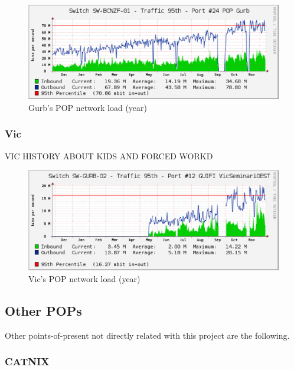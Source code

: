 \begin{figure}[htbp]
  \centering
  \includegraphics[scale=.65]{sect3/figures/gurb_network_load_year.eps} 
  \caption{Gurb's POP network load (year)}
  \label{fig:gurb_net_load}
\end{figure}


\subsubsection{Vic}

VIC HISTORY ABOUT KIDS AND FORCED WORKD

\begin{figure}[htbp]
  \centering
  \includegraphics[scale=.65]{sect3/figures/vic_network_load_year.eps} 
  \caption{Vic's POP network load (year)}
  \label{fig:vic_net_load}
\end{figure}



\subsection{Other POPs}

Other points-of-present not directly related with this project are the following.

\subsubsection{CATNIX}

\bigskip 

